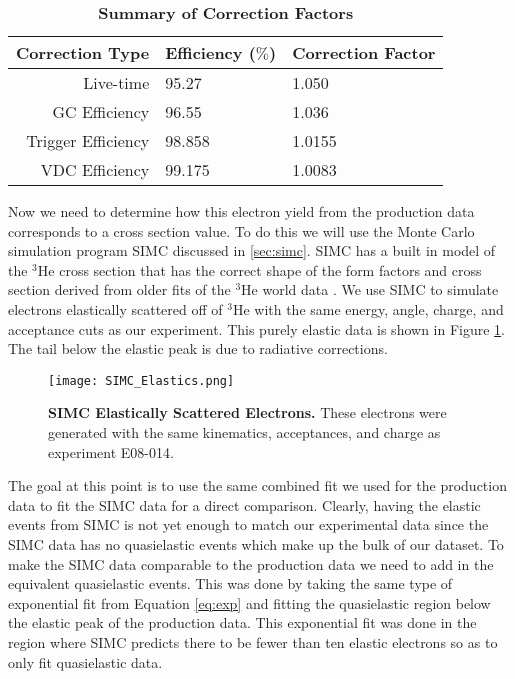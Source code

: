 \vspace{5mm}

\begin{table}[!h]
\centering
\begin{tabular}{|r | l l|}
\hline
\textbf{Correction Type} & \textbf{Efficiency ($\%$)} & \textbf{Correction Factor}\\
\hline
Live-time & 95.27 & 1.050 \\ 
GC Efficiency & 96.55 & 1.036 \\ 
Trigger Efficiency & 98.858 & 1.0155 \\ 
VDC Efficiency & 99.175 &  1.0083\\ 
\hline
\end{tabular}
\caption[Summary of Correction Factors]{{\bf{Summary of Correction Factors}} }
\label{tab:corrections}
\end{table}

Now we need to determine how this electron yield from the production data corresponds to a cross section value. To do this we will use the Monte Carlo simulation program SIMC discussed in \ref{sec:simc}. SIMC has a built in model of the $^3$He cross section that has the correct shape of the form factors and cross section derived from older fits of the $^3$He world data \cite{Article:Amroun}. We use SIMC to simulate electrons elastically scattered off of $^3$He with the same energy, angle, charge, and acceptance cuts as our experiment. This purely elastic data is shown in Figure \ref{fig:simc_elastics}. The tail below the elastic peak is due to radiative corrections.

\begin{figure}[!ht]
\begin{center}
\texttt{[image: SIMC\_Elastics.png]}
\end{center}
\caption[SIMC Elastically Scattered Electrons]{
{\bf{SIMC Elastically Scattered Electrons.}} These electrons were generated with the same kinematics, acceptances, and charge as experiment E08-014.}
\label{fig:simc_elastics}
\end{figure}

The goal at this point is to use the same combined fit we used for the production data to fit the SIMC data for a direct comparison. Clearly, having the elastic events from SIMC is not yet enough to match our experimental data since the SIMC data has no quasielastic events which make up the bulk of our dataset. To make the SIMC data comparable to the production data we need to add in the equivalent quasielastic events. This was done by taking the same type of exponential fit from Equation \ref{eq:exp} and fitting the quasielastic region below the elastic peak of the production data. This exponential fit was done in the region where SIMC predicts there to be fewer than ten elastic electrons so as to only fit quasielastic data. 

